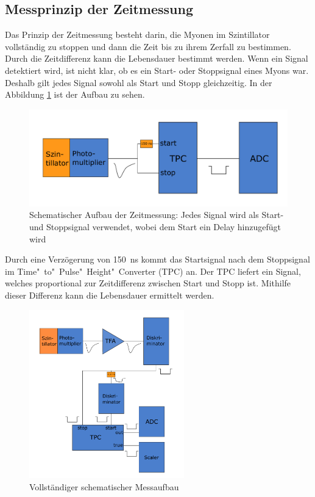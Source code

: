 \documentclass[12pt,a4paper,ngerman]{report}
\begin{document}
	\subsection{Messprinzip der Zeitmessung}
	Das Prinzip der Zeitmessung besteht darin, die Myonen im Szintillator vollständig zu stoppen und dann die Zeit bis zu ihrem Zerfall zu bestimmen. Durch die Zeitdifferenz kann die Lebensdauer bestimmt werden. Wenn ein Signal detektiert wird, ist nicht klar, ob es ein Start- oder Stoppsignal eines Myons war. Deshalb gilt jedes Signal sowohl als Start und Stopp gleichzeitig. In der Abbildung \ref{img:ZeitEinfach} ist der Aufbau zu sehen.
	\begin{figure}[ht]
		\centering
		\includegraphics[width=\textwidth]{Bilder/ZeitmessungEinfach.pdf}		
		\caption[Schematischer Aufbau der Zeitmessung]{Schematischer Aufbau der Zeitmessung: Jedes Signal wird als Start- und Stoppsignal verwendet, wobei dem Start ein Delay hinzugefügt wird }
		\label{img:ZeitEinfach}
	\end{figure}
	Durch eine Verzögerung von \SI{150}{\nano \second} kommt das Startsignal nach dem Stoppsignal im Time"~to"~Pulse"~Height"~Converter (TPC) an. Der TPC liefert ein Signal, welches proportional zur Zeitdifferenz zwischen Start und Stopp ist. Mithilfe dieser Differenz kann die Lebensdauer ermittelt werden.\\
	\begin{figure}[ht]
		\centering
		\includegraphics[width=0.6\textwidth]{Bilder/ZeitmessungKomplex.pdf}		
		\caption[schematischer Messaufbau]{Vollständiger schematischer Messaufbau}
		\label{img:ZeitmessungKomplex}
	\end{figure}
\end{document}
